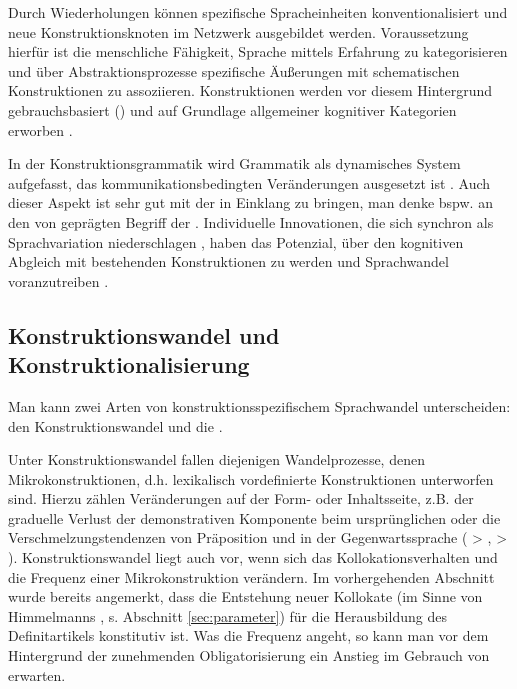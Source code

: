 Durch Wiederholungen können spezifische Spracheinheiten konventionalisiert und neue Konstruktionsknoten im Netzwerk ausgebildet werden. Voraussetzung hierfür ist die menschliche Fähigkeit, Sprache mittels Erfahrung zu kategorisieren und über Abstraktionsprozesse spezifische Äußerungen mit schematischen Konstruktionen zu assoziieren. Konstruktionen werden vor diesem Hintergrund gebrauchsbasiert () und auf Grundlage allgemeiner kognitiver Kategorien erworben \parencite[u.a.][]{Langacker1987,Goldberg2006,Bybee2006,Bybee2010,Bybee2013}.

In der Konstruktionsgrammatik wird Grammatik als dynamisches System aufgefasst, das kommunikationsbedingten Veränderungen ausgesetzt ist \parencite[35--36]{Imo2007}. Auch dieser Aspekt ist sehr gut mit der  in Einklang zu bringen, man denke bspw. an den von  \textcite{Hopper1991} geprägten Begriff der . Individuelle Innovationen, die sich synchron als Sprachvariation niederschlagen \parencite{Croft2010}, haben das Potenzial, über den kognitiven Abgleich mit bestehenden Konstruktionen  zu werden und Sprachwandel voranzutreiben \parencite[66]{Langacker1987}. 

\subsection{Konstruktionswandel und Konstruktionalisierung}\label{sec:konstruktionalisierung}

Man kann zwei Arten von konstruktionsspezifischem Sprachwandel unterscheiden: den Konstruktionswandel und die  \parencite[vgl.][]{Hilpert2011,Hilpert2013,Fried2013,Traugott2013,Traugott2015,Trousdale2014}. 

Unter Konstruktionswandel fallen diejenigen Wandelprozesse, denen Mikrokonstruktionen, d.h. lexikalisch vordefinierte Konstruktionen unterworfen sind. Hierzu zählen Veränderungen auf der Form- oder Inhaltsseite, z.B. der graduelle Verlust der demonstrativen Komponente beim ursprünglichen   oder die Verschmelzungstendenzen von Präposition und  in der Gegenwartssprache ( > ,  > ). Konstruktionswandel liegt auch vor, wenn sich das Kollokationsverhalten und die Frequenz einer Mikrokonstruktion  verändern. Im vorhergehenden Abschnitt wurde bereits angemerkt, dass die Entstehung neuer Kollokate (im Sinne von Himmelmanns  , s. Abschnitt \ref{sec:parameter}) für die Herausbildung des Definitartikels konstitutiv ist. Was die Frequenz angeht, so kann man vor dem Hintergrund der zunehmenden Obligatorisierung ein Anstieg im Gebrauch von  erwarten. 

